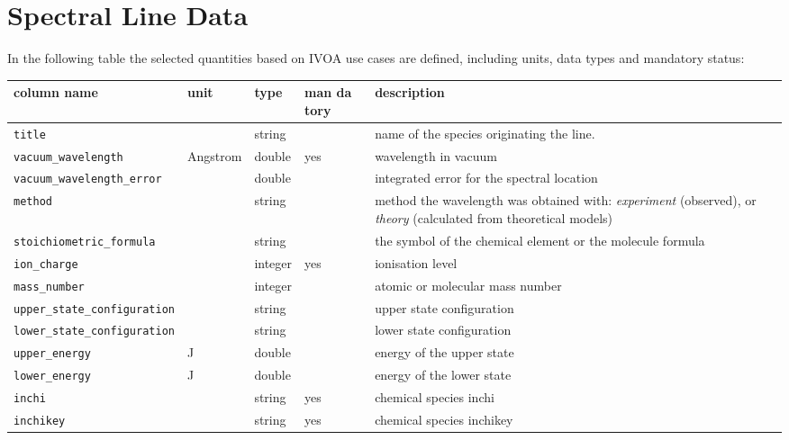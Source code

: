 \documentclass[11pt,a4paper]{ivoa}
\begin{document}
\section{Spectral Line Data}\label{quantities}

In the following table the selected quantities based on IVOA use cases are defined, 
including units, data types and mandatory status:


\begin{table}[H]
\small
\begin{tabular}{|l|l|l|p{0.8cm}|p{4cm}|}%
\hline
\textbf{column name} & \textbf{unit} & \textbf{type} & \textbf{man da tory} & 
\textbf{description} \\
\hline
\hline
\texttt{title} & & string & & name of the species originating  the line.  \\
\hline
\texttt{vacuum\_wavelength} & Angstrom & double & yes &  wavelength in vacuum \\
\hline
\texttt{vacuum\_wavelength\_error} & & double & & integrated error for the spectral location \\
\hline
\texttt{method} && string& & method the wavelength was obtained with:
\textit{experiment} (observed), or \textit{theory} (calculated from theoretical models) \\ 
\hline
\texttt{stoichiometric\_formula} & & string & &  the symbol of the chemical element or the 
molecule formula\\
\hline
\texttt{ion\_charge} & & integer & yes & ionisation level\\
\hline
\texttt{mass\_number} & & integer &  & atomic or molecular mass number\\
\hline
\texttt{upper\_state\_configuration} & & string & & upper state configuration\\
\hline
\texttt{lower\_state\_configuration} & & string & & lower state configuration\\
\hline
\texttt{upper\_energy} & J  & double & & energy of the upper state \\
\hline
\texttt{lower\_energy} & J & double & & energy of the lower state\\
\hline
\texttt{inchi} & & string & yes & chemical species inchi \\
\hline
\texttt{inchikey} & & string & yes & chemical species inchikey \\

\end{tabular}
\end{table}
\end{document}
